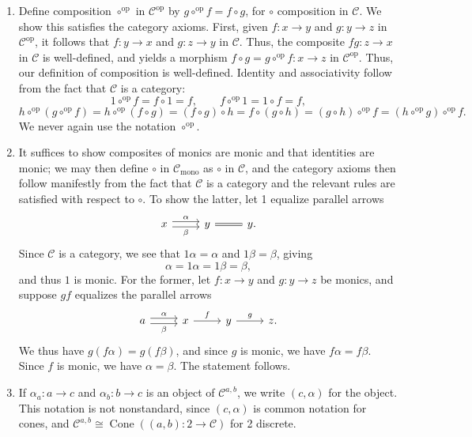 \documentclass[11pt, letterpaper]{article}
\begin{document}
\begin{enumerate}
	\item Define composition $\circ ^{\mathrm{op}} $ in $\mathcal{C} ^{\mathrm{op}} $ by $g\circ ^{\mathrm{op}} f=f\circ g$, for $\circ $ composition in $\mathcal{C} $. We show this satisfies the category axioms. First, given $f : x \to y$ and $g : y \to z$ in $\mathcal{C} ^{\mathrm{op}} $, it follows that $f : y \to x$ and $g : z \to y$ in $\mathcal{C} $. Thus, the composite $fg : z \to x$ in $\mathcal{C} $ is well-defined, and yields a morphism $f\circ g=g\circ ^{\mathrm{op}} f : x\to z$ in $\mathcal{C} ^{\mathrm{op}} $. Thus, our definition of composition is well-defined. Identity and associativity follow from the fact that $\mathcal{C} $ is a category:
		\[
			1\circ ^{\mathrm{op}} f=f\circ 1=f,\qquad f\circ ^{\mathrm{op}} 1=1\circ f=f,
		\]
		\[
			h\circ^{\mathrm{op}} (g\circ ^{\mathrm{op}} f)=h\circ ^{\mathrm{op}} (f\circ g)=(f\circ g)\circ h=f\circ (g\circ h)=(g\circ h)\circ ^{\mathrm{op}} f=(h\circ ^{\mathrm{op}} g)\circ ^{\mathrm{op}} f
		.\]
		We never again use the notation $\circ ^{\mathrm{op}} $.
	\item It suffices to show composites of monics are monic and that identities are monic; we may then define $\circ $ in $\mathcal{C} _{\mathrm{mono} } $ as $\circ $ in $\mathcal{C} $, and the category axioms then follow manifestly from the fact that $\mathcal{C} $ is a category and the relevant rules are satisfied with respect to $\circ $. To show the latter, let 1 equalize parallel arrows
		\[\begin{tikzcd}[row sep = 2.5em, column sep = 2.5em]
		x \ar[" \alpha  ", shift left, r] \ar[" \beta  "', shift right, r]  & y \ar[equals, r]  & y.
		\end{tikzcd}\]
		Since $\mathcal{C} $ is a category, we see that $1\alpha =\alpha $ and $1\beta =\beta $, giving
		\[
			\alpha =1\alpha =1\beta =\beta ,
		\]
		and thus $1$ is monic. For the former, let $f : x \to y$ and $g : y \to z$ be monics, and suppose $gf$ equalizes the parallel arrows
		\[\begin{tikzcd}[row sep = 2.5em, column sep = 2.5em]
		a \ar[" \alpha  ", shift left, r] \ar[" \beta  "', shift right, r]  & x \ar[" f ", r]  & y\ar[" g ", r]  & z.
		\end{tikzcd}\]
		We thus have $g(f\alpha )=g(f\beta )$, and since $g$ is monic, we have $f\alpha =f\beta $. Since $f$ is monic, we have $\alpha =\beta $. The statement follows.
	\item If $\alpha _a : a \to c$ and $\alpha _b : b \to c$ is an object of $\mathcal{C} ^{a,b} $, we write $(c,\alpha )$ for the object. This notation is not nonstandard, since $(c,\alpha )$ is common notation for cones, and $\mathcal{C} ^{a,b} \cong \operatorname{Cone} ((a,b): 2 \to \mathcal{C} )$ for 2 discrete.


\end{enumerate}
\end{document}
